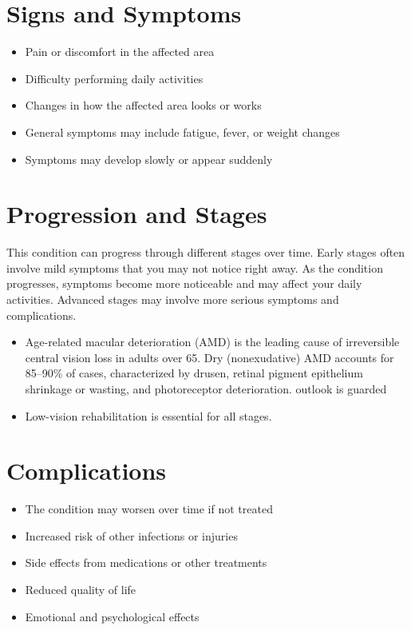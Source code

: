 \section{Signs and Symptoms}

\begin{itemize}[noitemsep]
  \item Pain or discomfort in the affected area
  \item Difficulty performing daily activities
  \item Changes in how the affected area looks or works
  \item General symptoms may include fatigue, fever, or weight changes
  \item Symptoms may develop slowly or appear suddenly
\end{itemize}

\section{Progression and Stages}
This condition can progress through different stages over time. Early stages often involve mild symptoms that you may not notice right away. As the condition progresses, symptoms become more noticeable and may affect your daily activities. Advanced stages may involve more serious symptoms and complications.

\begin{itemize}[noitemsep]
  \item Age-related macular deterioration (AMD) is the leading cause of irreversible central vision loss in adults over 65. Dry (nonexudative) AMD accounts for 85--90\% of cases, characterized by drusen, retinal pigment epithelium shrinkage or wasting, and photoreceptor deterioration. outlook is guarded
  \item Low-vision rehabilitation is essential for all stages.
\end{itemize}

\section{Complications}

\begin{itemize}[noitemsep]
  \item The condition may worsen over time if not treated
  \item Increased risk of other infections or injuries
  \item Side effects from medications or other treatments
  \item Reduced quality of life
  \item Emotional and psychological effects
\end{itemize}


